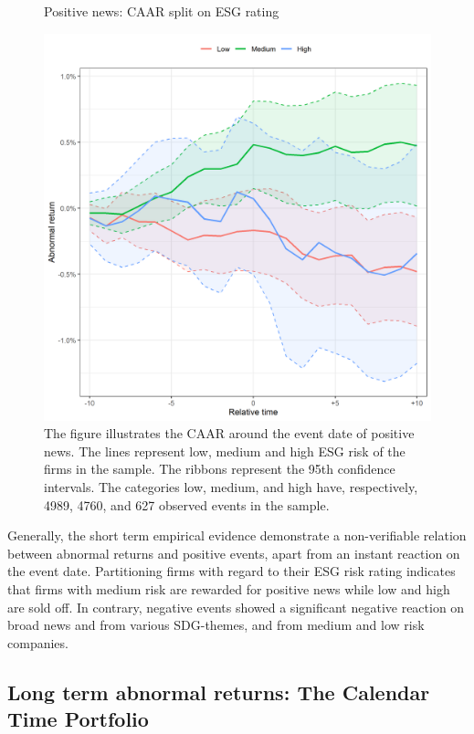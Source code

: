 \begin{figure} [H]
    \centering
    \caption{Positive news: CAAR split on ESG rating}
    \includegraphics[scale=0.6]{Projekt/1.Figures analysis/ST_positive_ESG.png}
     \caption*{\footnotesize The figure illustrates the CAAR around the event date of positive news. The lines represent low, medium and high ESG risk of the firms in the sample. The ribbons represent the 95th confidence intervals. The categories low, medium, and high have, respectively, 4989, 4760, and 627 observed events in the sample.  }
    \label{fig:ST_pos_ESG}
\end{figure} 

Generally, the short term empirical evidence demonstrate a non-verifiable relation between abnormal returns and positive events, apart from an instant reaction on the event date.  Partitioning firms with regard to their ESG risk rating indicates that firms with medium risk are rewarded for positive news while low and high are sold off. In contrary, negative events showed a significant negative reaction on broad news and from various SDG-themes, and from medium and low risk companies.   

\subsection{Long term abnormal returns: The Calendar Time Portfolio} \label{sec: long_term_portfolio}

